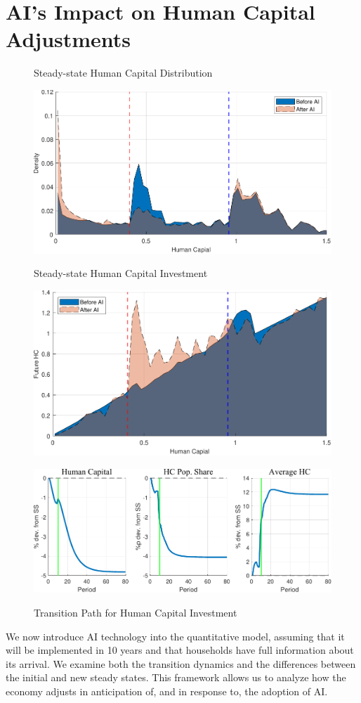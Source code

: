 \documentclass[12pt]{article}
\begin{document}
\section{AI's Impact on Human Capital Adjustments}
\begin{figure}
    \centering  
    \caption{Steady-state Human Capital Distribution}
    \includegraphics[width=0.9\linewidth]{figure_204040calib/h_dist.pdf}
    \label{fig:hc_dist}   
    \caption{Steady-state Human Capital Investment}
    \includegraphics[width=0.9\linewidth]{figure_204040calib/DR_h.pdf}
    \label{fig:hprime_h}    
    \caption{Transition Path for Human Capital Investment}
    \includegraphics[width=0.9\linewidth]{figure_204040calib/agg_HC.pdf}
    \label{fig:h_agg}
    
\end{figure}
We now introduce AI technology into the quantitative model, assuming that it will be implemented in 10 years and that households have full information about its arrival. We examine both the transition dynamics and the differences between the initial and new steady states. This framework allows us to analyze how the economy adjusts in anticipation of, and in response to, the adoption of AI.
\end{document}
